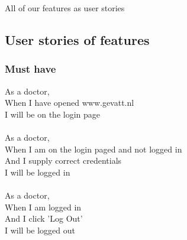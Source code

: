 All of our features as user stories
\subsection{User stories of features}
	\subsubsection*{Must have}
		As a doctor,\\
		When I have opened www.gevatt.nl\\
		I will be on the login page\\
		\\	
		As a doctor,\\
		When I am on the login paged and not logged in\\
		And I supply correct credentials\\
		I will be logged in\\
		\\	
		As a doctor,\\
		When I am logged in\\
		And I click 'Log Out'\\
		I will be logged out\\
	
